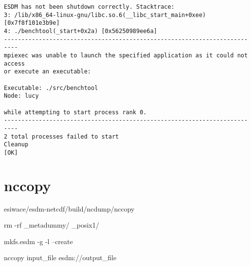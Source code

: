\begin{verbatim}
ESDM has not been shutdown correctly. Stacktrace:
3: /lib/x86_64-linux-gnu/libc.so.6(__libc_start_main+0xee) [0x7f8f101e3b9e]
4: ./benchtool(_start+0x2a) [0x56250989ee6a]
--------------------------------------------------------------------------
mpiexec was unable to launch the specified application as it could not access
or execute an executable:

Executable: ./src/benchtool
Node: lucy

while attempting to start process rank 0.
--------------------------------------------------------------------------
2 total processes failed to start
Cleanup
[OK]
\end{verbatim}

\chapter{nccopy}

esiwace/esdm-netcdf/build/ncdump/nccopy

rm -rf \_metadummy/ \_posix1/

mkfs.esdm -g -l --create

nccopy input\_file esdm://output\_file

